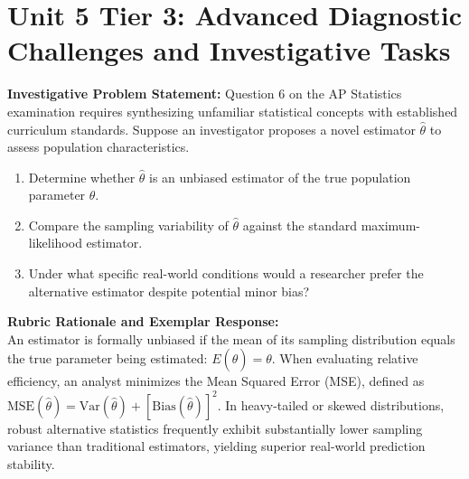\section{Unit 5 Tier 3: Advanced Diagnostic Challenges and Investigative Tasks}
\begin{frqrubricbox}
\textbf{Investigative Problem Statement:} Question 6 on the AP Statistics examination requires synthesizing unfamiliar statistical concepts with established curriculum standards. Suppose an investigator proposes a novel estimator $\hat{\theta}$ to assess population characteristics.
\begin{enumerate}[label=(\alph*)]
  \item Determine whether $\hat{\theta}$ is an unbiased estimator of the true population parameter $\theta$.
  \item Compare the sampling variability of $\hat{\theta}$ against the standard maximum-likelihood estimator.
  \item Under what specific real-world conditions would a researcher prefer the alternative estimator despite potential minor bias?
\end{enumerate}
\textbf{Rubric Rationale and Exemplar Response:}\\
An estimator is formally unbiased if the mean of its sampling distribution equals the true parameter being estimated: $E(\hat{\theta}) = \theta$. When evaluating relative efficiency, an analyst minimizes the Mean Squared Error (MSE), defined as $\text{MSE}(\hat{\theta}) = \text{Var}(\hat{\theta}) + [\text{Bias}(\hat{\theta})]^2$. In heavy-tailed or skewed distributions, robust alternative statistics frequently exhibit substantially lower sampling variance than traditional estimators, yielding superior real-world prediction stability.
\end{frqrubricbox}\vspace{6pt}
